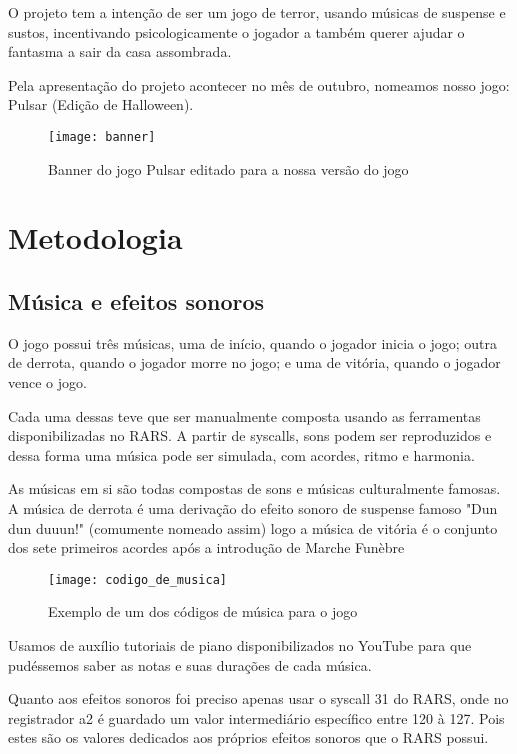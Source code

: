 \documentclass[conference]{IEEEtran}
\begin{document}
O projeto tem a intenção de ser um jogo de terror, usando músicas de suspense e sustos, incentivando psicologicamente o jogador a também querer ajudar o fantasma a sair da casa assombrada.

Pela apresentação do projeto acontecer no mês de outubro, nomeamos nosso jogo: Pulsar (Edição de Halloween).


\begin{figure}[h]
\centering
\texttt{[image: banner]}
\caption{Banner do jogo Pulsar editado para a nossa versão do jogo}
\end{figure}

\section{Metodologia}

\subsection{Música e efeitos sonoros}

O jogo possui três músicas, uma de início, quando o jogador inicia o jogo; outra de derrota, quando o jogador morre no jogo; e uma de vitória, quando o jogador vence o jogo.

Cada uma dessas teve que ser manualmente composta usando as ferramentas disponibilizadas no RARS. A partir de syscalls, sons podem ser reproduzidos e dessa forma uma música pode ser simulada, com acordes, ritmo e harmonia.

As músicas em si são todas compostas de sons e músicas culturalmente famosas. A música de derrota é uma derivação do efeito sonoro de suspense famoso "Dun dun duuun!" (comumente nomeado assim\textsuperscript{\cite{b3}})
logo a música de vitória é o conjunto dos sete primeiros acordes após a introdução de Marche Funèbre\textsuperscript{\cite{b4}}

\begin{figure}[h]
\centering
\texttt{[image: codigo\_de\_musica]}
\caption{Exemplo de um dos códigos de música para o jogo}
\end{figure}  

Usamos de auxílio tutoriais de piano disponibilizados no YouTube para que pudéssemos saber as notas e suas durações de cada música.

Quanto aos efeitos sonoros foi preciso apenas usar o syscall 31 do RARS, onde no registrador a2 é guardado um valor intermediário específico entre 120 à 127. Pois estes são os valores dedicados aos próprios efeitos sonoros que o RARS possui.
\end{document}
